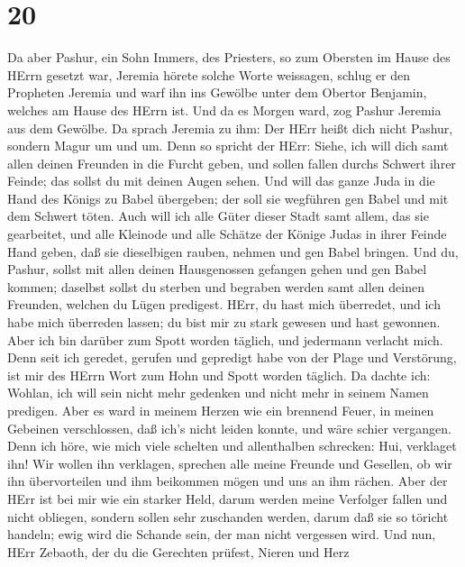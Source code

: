 \hypertarget{section-19}{%
\section{20}\label{section-19}}

 Da aber Pashur, ein Sohn Immers, des Priesters, so zum
Obersten im Hause des HErrn gesetzt war, Jeremia hörete solche Worte
weissagen,  schlug er den Propheten Jeremia und warf ihn ins
Gewölbe unter dem Obertor Benjamin, welches am Hause des HErrn ist.
 Und da es Morgen ward, zog Pashur Jeremia aus dem Gewölbe.
Da sprach Jeremia zu ihm: Der HErr heißt dich nicht Pashur, sondern
Magur um und um.  Denn so spricht der HErr: Siehe, ich will
dich samt allen deinen Freunden in die Furcht geben, und sollen fallen
durchs Schwert ihrer Feinde; das sollst du mit deinen Augen sehen. Und
will das ganze Juda in die Hand des Königs zu Babel übergeben; der soll
sie wegführen gen Babel und mit dem Schwert töten.  Auch
will ich alle Güter dieser Stadt samt allem, das sie gearbeitet, und
alle Kleinode und alle Schätze der Könige Judas in ihrer Feinde Hand
geben, daß sie dieselbigen rauben, nehmen und gen Babel bringen.
 Und du, Pashur, sollst mit allen deinen Hausgenossen
gefangen gehen und gen Babel kommen; daselbst sollst du sterben und
begraben werden samt allen deinen Freunden, welchen du Lügen predigest.
 HErr, du hast mich überredet, und ich habe mich überreden
lassen; du bist mir zu stark gewesen und hast gewonnen. Aber ich bin
darüber zum Spott worden täglich, und jedermann verlacht mich.
 Denn seit ich geredet, gerufen und gepredigt habe von der
Plage und Verstörung, ist mir des HErrn Wort zum Hohn und Spott worden
täglich.  Da dachte ich: Wohlan, ich will sein nicht mehr
gedenken und nicht mehr in seinem Namen predigen. Aber es ward in meinem
Herzen wie ein brennend Feuer, in meinen Gebeinen verschlossen, daß
ich's nicht leiden konnte, und wäre schier vergangen.  Denn
ich höre, wie mich viele schelten und allenthalben schrecken: Hui,
verklaget ihn! Wir wollen ihn verklagen, sprechen alle meine Freunde und
Gesellen, ob wir ihn übervorteilen und ihm beikommen mögen und uns an
ihm rächen.  Aber der HErr ist bei mir wie ein starker
Held, darum werden meine Verfolger fallen und nicht obliegen, sondern
sollen sehr zuschanden werden, darum daß sie so töricht handeln; ewig
wird die Schande sein, der man nicht vergessen wird.  Und
nun, HErr Zebaoth, der du die Gerechten prüfest, Nieren und Herz
